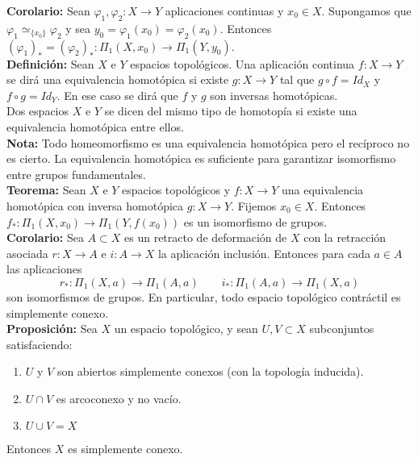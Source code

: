 \documentclass{article}
\begin{document}
\textbf{Corolario:} Sean $\varphi_1,\varphi_2:X\rightarrow Y$ aplicaciones continuas y $x_0\in X$. Supongamos que $\varphi_1\simeq_{\{x_0\}}\varphi_2$ y sea $y_0=\varphi_1(x_0)=\varphi_2(x_0)$. Entonces $(\varphi_1)_*=(\varphi_2)_*:\Pi_1(X,x_0)\rightarrow \Pi_1(Y,y_0)$.\\

\textbf{Definición:} Sean $X$ e $Y$ espacios topológicos. Una aplicación continua $f:X\rightarrow Y$ se dirá una equivalencia homotópica si existe $g:X\rightarrow Y$ tal que $g\circ f=Id_X$ y $f\circ g=Id_Y$. En ese caso se dirá que $f$ y $g$ son inversas homotópicas. \\

Dos espacios $X$ e $Y$ se dicen del mismo tipo de homotopía si existe una equivalencia homotópica entre ellos. \\

\textbf{Nota:} Todo homeomorfismo es una equivalencia homotópica pero el recíproco no es cierto. La equivalencia homotópica es suficiente para garantizar isomorfismo entre grupos fundamentales. \\

\textbf{Teorema:} Sean $X$ e $Y$ espacios topológicos y $f:X\rightarrow Y$ una equivalencia homotópica con inversa homotópica $g:X\rightarrow Y$. Fijemos $x_0\in X$. Entonces $f_*:\Pi_1(X,x_0)\rightarrow \Pi_1(Y,f(x_0))$ es un isomorfismo de grupos. \\

\textbf{Corolario:} Sea $A\subset X$ es un retracto de deformación de $X$ con la retracción asociada $r:X\rightarrow A$ e $i:A\rightarrow X$ la aplicación inclusión. Entonces para cada $a\in A$ las aplicaciones 
\begin{equation*}
r_*:\Pi_1(X,a)\rightarrow \Pi_1(A,a)\qquad i_*:\Pi_1(A,a)\rightarrow \Pi_1(X,a)
\end{equation*}
son isomorfismos de grupos. En particular, todo espacio topológico contráctil es simplemente conexo. \\

\textbf{Proposición:} Sea $X$ un espacio topológico, y sean $U,V\subset X$ subconjuntos satisfaciendo:
\begin{enumerate}
\item $U$ y $V$ son abiertos simplemente conexos (con la topología inducida).

\item $U\cap V$ es arcoconexo y no vacío.

\item $U\cup V=X$
\end{enumerate}
Entonces $X$ es simplemente conexo.\\
\end{document}
